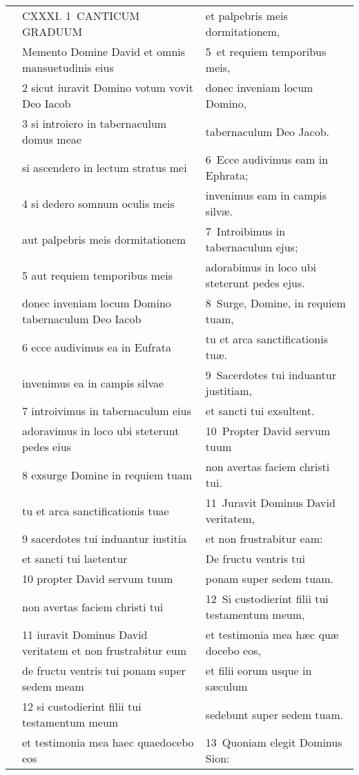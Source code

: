 \documentclass{article}
\begin{document}
\begin{longtable}{@{}p{}p{}p{}@{}}
	&	CXXXI. 1 CANTICUM GRADUUM	&	et palpebris meis dormitationem,	\\
	&	Memento Domine David et omnis mansuetudinis eius	&	5 et requiem temporibus meis,	\\
	&	2 sicut iuravit Domino votum vovit Deo Iacob	&	donec inveniam locum Domino,	\\
	&	3 si introiero in tabernaculum domus meae	&	tabernaculum Deo Jacob.	\\
	&	si ascendero in lectum stratus mei	&	6 Ecce audivimus eam in Ephrata;	\\
	&	4 si dedero somnum oculis meis	&	invenimus eam in campis silvæ.	\\
	&	aut palpebris meis dormitationem	&	7 Introibimus in tabernaculum ejus;	\\
	&	5 aut requiem temporibus meis	&	adorabimus in loco ubi steterunt pedes ejus.	\\
	&	donec inveniam locum Domino tabernaculum Deo Iacob	&	8 Surge, Domine, in requiem tuam,	\\
	&	6 ecce audivimus ea in Eufrata	&	tu et arca sanctificationis tuæ.	\\
	&	invenimus ea in campis silvae	&	9 Sacerdotes tui induantur justitiam,	\\
	&	7 introivimus in tabernaculum eius	&	et sancti tui exsultent.	\\
	&	adoravimus in loco ubi steterunt pedes eius	&	10 Propter David servum tuum	\\
	&	8 exsurge Domine in requiem tuam	&	non avertas faciem christi tui.	\\
	&	tu et arca sanctificationis tuae	&	11 Juravit Dominus David veritatem,	\\
	&	9 sacerdotes tui induantur iustitia	&	et non frustrabitur eam:	\\
	&	et sancti tui laetentur	&	De fructu ventris tui	\\
	&	10 propter David servum tuum	&	ponam super sedem tuam.	\\
	&	non avertas faciem christi tui	&	12 Si custodierint filii tui testamentum meum,	\\
	&	11 iuravit Dominus David veritatem et non frustrabitur eum	&	et testimonia mea hæc quæ docebo eos,	\\
	&	de fructu ventris tui ponam super sedem meam	&	et filii eorum usque in sæculum	\\
	&	12 si custodierint filii tui testamentum meum	&	sedebunt super sedem tuam.	\\
	&	et testimonia mea haec quaedocebo eos	&	13 Quoniam elegit Dominus Sion:	\\

\end{longtable}
\end{document}
